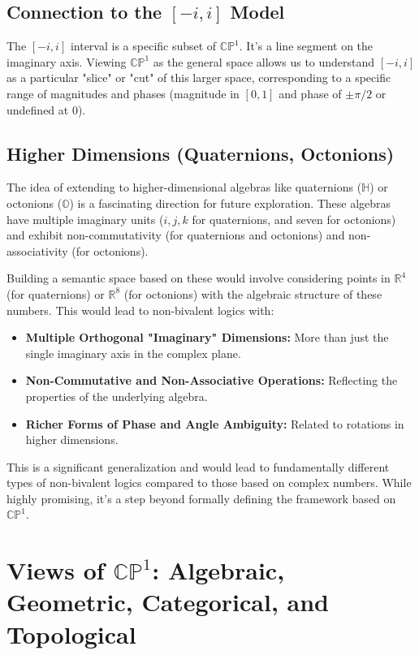 \documentclass{article}
\begin{document}
	\subsection{Connection to the $[-i, i]$ Model}
	
	The $[-i, i]$ interval is a specific subset of $\mathbb{CP}^1$. It's a line segment on the imaginary axis. Viewing $\mathbb{CP}^1$ as the general space allows us to understand $[-i, i]$ as a particular "slice" or "cut" of this larger space, corresponding to a specific range of magnitudes and phases (magnitude in $[0, 1]$ and phase of $\pm\pi/2$ or undefined at 0).
	
	\subsection{Higher Dimensions (Quaternions, Octonions)}
	
	The idea of extending to higher-dimensional algebras like quaternions ($\mathbb{H}$) or octonions ($\mathbb{O}$) is a fascinating direction for future exploration. These algebras have multiple imaginary units ($i, j, k$ for quaternions, and seven for octonions) and exhibit non-commutativity (for quaternions and octonions) and non-associativity (for octonions).
	
	Building a semantic space based on these would involve considering points in $\mathbb{R}^4$ (for quaternions) or $\mathbb{R}^8$ (for octonions) with the algebraic structure of these numbers. This would lead to non-bivalent logics with:
	
	\begin{itemize}
		\item \textbf{Multiple Orthogonal "Imaginary" Dimensions:} More than just the single imaginary axis in the complex plane.
		
		\item \textbf{Non-Commutative and Non-Associative Operations:} Reflecting the properties of the underlying algebra.
		
		\item \textbf{Richer Forms of Phase and Angle Ambiguity:} Related to rotations in higher dimensions.
	\end{itemize}
	This is a significant generalization and would lead to fundamentally different types of non-bivalent logics compared to those based on complex numbers. While highly promising, it's a step beyond formally defining the framework based on $\mathbb{CP}^1$.
	
	\section{Views of $\mathbb{CP}^1$: Algebraic, Geometric, Categorical, and Topological}
	
\end{document}
